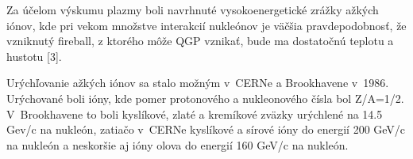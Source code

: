 Za účelom výskumu plazmy boli navrhnuté vysokoenergetické
zrážky \softt{}ažkých  iónov, kde pri ve\softl{}kom
množstve interakcií nukleónov je väčšia pravdepodobnosť,
že vzniknutý  fireball, z ktorého môže QGP vznikať, bude ma\softt{}
dostatočnú teplotu a hustotu [3].


Urýchľovanie \softt{}ažkých iónov sa stalo možným v~CERNe a
Brookhavene v~1986.  Urých\softl{}ované boli ióny, kde pomer
protonového a nukleonového čísla bol Z/A=1/2. V~Brookhavene to
boli kyslíkové, zlaté a kremíkové zväzky urýchlené na 14.5
Gev/c na nukleón, zatia\softl{}čo v~CERNe kyslíkové a sírové
ióny  do energií 200 GeV/c na nukleón a neskoršie
aj ióny olova do energií 160 GeV/c na nukleón.
%
%
